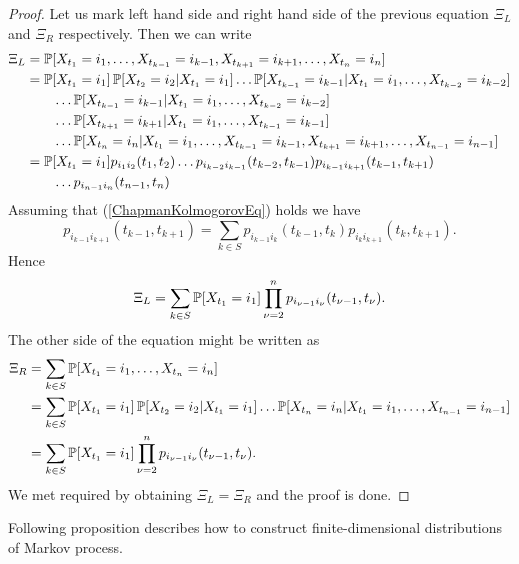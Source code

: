 {\begin{proof}
	Let us mark left hand side and right hand side of the previous equation $\Xi_L$ and $\Xi_R$ respectively. Then we can write
	\begin{align*}
		\Xi_L &= \operatorname{\mathbb{P}} [X_{t_1} = i_1, \ldots , X_{t_{k-1}} = i_{k-1}, X_{t_{k+1}} = i_{k+1}, \ldots , X_{t_n} = i_n] \\
		&= \operatorname{\mathbb{P}} [X_{t_1} = i_1] \operatorname{\mathbb{P}} [X_{t_2} = i_2 \vert X_{t_1} = i_1] \ldots  \operatorname{\mathbb{P}} [X_{t_{k-1}} = i_{k-1} \vert X_{t_1} = i_1, \ldots , X_{t_{k-2}} = i_{k-2}] \\
		& \qquad \ldots  \operatorname{\mathbb{P}} [X_{t_{k-1}} = i_{k-1} \vert X_{t_1} = i_1, \ldots , X_{t_{k-2}} = i_{k-2}] \\
		& \qquad \ldots  \operatorname{\mathbb{P}} [X_{t_{k+1}} = i_{k+1} \vert X_{t_1} = i_1, \ldots , X_{t_{k-1}} = i_{k-1}] \\
		& \qquad \ldots  \operatorname{\mathbb{P}} [X_{t_n} = i_n \vert X_{t_1} = i_1, \ldots , X_{t_{k-1}} = i_{k-1}, X_{t_{k+1}} = i_{k+1}, \ldots , X_{t_{n-1}} = i_{n-1}] \\
		&= \operatorname{\mathbb{P}} [X_{t_1} = i_1] p_{i_1 i_2} (t_1, t_2) \ldots  p_{i_{k-2} i_{k-1}} (t_{k-2}, t_{k-1}) p_{i_{k-1} i_{k+1}} (t_{k-1}, t_{k+1}) \\
		& \qquad \ldots  p_{i_{n-1} i_n} (t_{n-1}, t_n)
	\end{align*}
	Assuming that (\ref{ChapmanKolmogorovEq}) holds we have
	\[
		p_{i_{k-1} i_{k+1}} (t_{k-1}, t_{k+1}) = \sum_{k \in S} p_{i_{k-1} i_{k}} (t_{k-1}, t_{k}) p_{i_{k} i_{k+1}} (t_{k}, t_{k+1}).
	\]
	Hence
	\[
	\Xi_L = \sum_{k \in S} \operatorname{\mathbb{P}} [X_{t_1} = i_1] \prod_{\nu = 2}^{n} p_{i_{\nu-1} i_{\nu}} (t_{\nu-1}, t_{\nu}).
	\]
	The other side of the equation might be written as
	\begin{align*}
		\Xi_R &= \sum_{k \in S} \operatorname{\mathbb{P}} [X_{t_1} = i_1, \ldots , X_{t_n} = i_n] \\
		&= \sum_{k \in S} \operatorname{\mathbb{P}} [X_{t_1} = i_1] \operatorname{\mathbb{P}} [X_{t_2} = i_2 \vert X_{t_1} = i_1] \ldots  \operatorname{\mathbb{P}} [X_{t_n} = i_n \vert X_{t_1} = i_1 , \ldots , X_{t_{n-1}} = i_{n-1}] \\
		&= \sum_{k \in S} \operatorname{\mathbb{P}} [X_{t_1} = i_1] \prod_{\nu = 2}^{n} p_{i_{\nu-1} i_{\nu}} (t_{\nu-1}, t_{\nu}).
	\end{align*}
	We met required by obtaining $\Xi_L = \Xi_R$ and the proof is done.
\end{proof}

Following proposition describes how to construct finite-dimensional distributions of Markov process.

}
